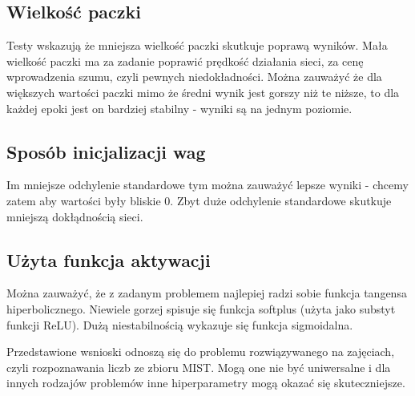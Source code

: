 \documentclass{article}
\begin{document}
\subsection{Wielkość paczki}

Testy wskazują że mniejsza wielkość paczki skutkuje poprawą wyników. Mała wielkość paczki ma za zadanie
poprawić prędkość działania sieci, za cenę wprowadzenia szumu, czyli pewnych niedokładności. Można zauważyć że dla większych wartości paczki
mimo że średni wynik jest gorszy niż te niższe, to dla każdej epoki jest on bardziej stabilny - wyniki są na jednym poziomie.

\subsection{Sposób inicjalizacji wag}

Im mniejsze odchylenie standardowe tym można zauważyć lepsze wyniki - chcemy zatem aby wartości były bliskie 0. Zbyt duże odchylenie standardowe
skutkuje mniejszą dokłądnością sieci.

\subsection{Użyta funkcja aktywacji}

Można zauważyć, że z zadanym problemem najlepiej radzi sobie funkcja tangensa hiperbolicznego. Niewiele gorzej spisuje się
funkcja softplus (użyta jako substyt funkcji ReLU). Dużą niestabilnością wykazuje się funkcja sigmoidalna.

\vspace{30pt}
Przedstawione wsnioski odnoszą się do problemu rozwiązywanego na zajęciach, czyli rozpoznawania liczb ze zbioru MIST.
Mogą one nie być uniwersalne i dla innych rodzajów problemów inne hiperparametry mogą okazać się skuteczniejsze.
\end{document}
